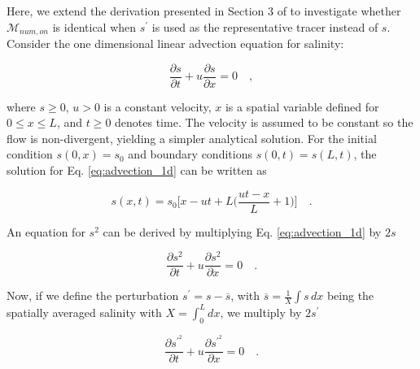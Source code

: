 \documentclass[draft]{agujournal2019}
\begin{document}
Here, we extend the derivation presented in Section 3 of  to investigate whether $\mathcal{M}_{num, on}$ is identical when $s^{\prime}$ is used as the representative tracer instead of $s$. Consider the one dimensional linear advection equation for salinity:
\begin{linenomath*}
\begin{equation} \label{eq:advection_1d}
    \frac{\partial s}{\partial t}+u\frac{\partial s}{\partial x} = 0 \quad ,
\end{equation} 
\end{linenomath*}
where $s \geq0$, $u>0$ is a constant velocity, $x$ is a spatial variable defined for $0 \leq x \leq L$, and $t \geq 0$ denotes time. The velocity is assumed to be constant so the flow is non-divergent, yielding a simpler analytical solution. For the initial condition $s(0,x)=s_0$ and boundary conditions $s(0,t)=s(L,t)$, the solution for Eq. \ref{eq:advection_1d} can be written as
\begin{linenomath*}
\begin{equation}
s(x,t) = s_0 \bigg[x-ut+L \bigg(\frac{ut-x}{L}+1 \bigg) \bigg] \quad .
\end{equation}
\end{linenomath*}
An equation for $s^2$ can be derived by multiplying Eq. \ref{eq:advection_1d} by $2s$
\begin{linenomath*}
\begin{equation} \label{eq:advection_phi2}
    \frac{\partial s^2}{\partial t}+u\frac{\partial s^2}{\partial x} = 0 \quad .
\end{equation}
\end{linenomath*}
Now, if we define the perturbation $s^\prime = s-\overline{s}$, with $\overline{s} = \frac{1}{X} \int s \, dx$ being the spatially averaged salinity with $X = \int_0^L dx$, we multiply by $2s^\prime$ 
\begin{linenomath*}
\begin{equation} \label{eq:advection_phip}
    \frac{\partial s^{\prime^2}}{\partial t}+u\frac{\partial s^{\prime^2}}{\partial x} = 0 \quad .
\end{equation}
\end{linenomath*}
\end{document}
